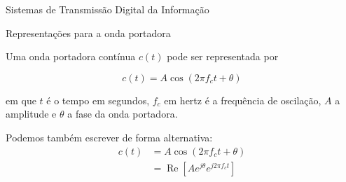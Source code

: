 \documentclass[
  ignorenonframetext,
]{beamer}
\begin{document}
\begin{frame}{Sistemas de Transmissão Digital da Informação}
%
%
%

\end{frame}

\begin{frame}{Representações para a onda portadora}

Uma onda portadora contínua \(c(t)\) pode ser representada por

\begin{equation} c(t) = A \cos \left(2\pi f_c t + \theta\right) \end{equation}

em que \(t\) é o tempo em segundos, \(f_{c}\) em hertz é a frequência de
oscilação, \(A\) a amplitude e \(\theta\) a fase da onda portadora.

Podemos também escrever de forma alternativa:
\[ \begin{aligned}c(t) &= A \cos \left(2\pi f_c t + \theta\right)\\ &= \operatorname{Re}\left[A e^{j \theta} e^{j2\pi f_c t}\right] \end{aligned} \]
\end{frame}
\end{document}
